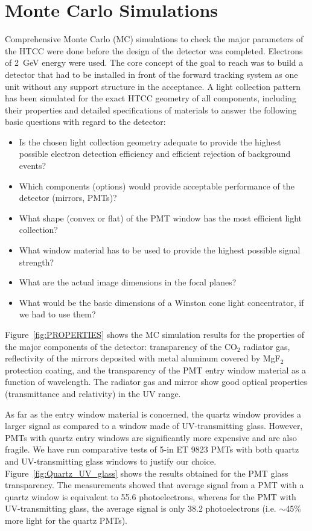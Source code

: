 \section{Monte Carlo Simulations}
\label{htcc-sim-sec}

Comprehensive Monte Carlo (MC) simulations to check the major parameters of the HTCC were done before the
design of the detector was completed. Electrons of 2~GeV energy were used. The core concept of the goal to
reach was to build a detector that had to be installed in front of the forward tracking system as one unit without
any support structure in the acceptance. A light collection pattern has been simulated for the exact HTCC
geometry of all components, including their properties and detailed  specifications of materials to answer the
following basic questions with regard to the detector:

\begin{itemize}
\item Is the chosen light collection geometry adequate to provide the highest possible electron detection efficiency
  and efficient rejection of background events?
\item Which components (options) would provide acceptable performance of the detector (mirrors, PMTs)?
\item What shape (convex or flat) of the PMT window has the most efficient light collection?
\item What window material has to be used to provide the highest possible signal strength?
\item What are the actual image dimensions in the focal planes?
\item What would be the basic dimensions of a Winston cone light concentrator, if we had to use them?
\end{itemize}

Figure~\ref{fig:PROPERTIES} shows the MC simulation results for the properties of the major components of the
detector: transparency of the CO$_2$ radiator gas, reflectivity of the mirrors deposited with metal aluminum
covered by MgF$_2$ protection coating, and the transparency of the PMT entry window material as a function of
wavelength. The radiator gas and mirror show good optical properties (transmittance and relativity) in the UV
range.

As far as the entry window material is concerned, the quartz window provides a larger signal as compared
to a window made of UV-transmitting glass. However, PMTs with quartz entry windows are significantly more
expensive and are also fragile. We have run comparative tests of 5-in ET 9823 PMTs with both quartz and
UV-transmitting glass windows to justify our choice. Figure~\ref{fig:Quartz_UV_glass} shows the results obtained
for the PMT glass transparency. The measurements showed that average signal from a PMT with a quartz window
is equivalent to 55.6 photoelectrons, whereas for the PMT with UV-transmitting glass, the average signal is only
38.2 photoelectrons (i.e. $\sim$45\% more light for the quartz PMTs).

